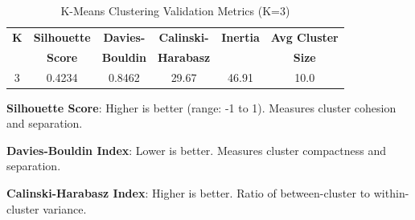 \begin{table}[htbp]
\centering
\caption{K-Means Clustering Validation Metrics (K=3)}
\label{tab:clustering_metrics}
\begin{tabular}{cccccc}
\toprule
\textbf{K} & \textbf{Silhouette} & \textbf{Davies-} & \textbf{Calinski-} & \textbf{Inertia} & \textbf{Avg Cluster} \\
           & \textbf{Score}      & \textbf{Bouldin} & \textbf{Harabasz}  &                  & \textbf{Size}        \\
\midrule
    3 & 0.4234 & 0.8462 & 29.67 & 46.91 & 10.0 \\
\bottomrule
\end{tabular}
\begin{tablenotes}
    \small
    \item \textbf{Silhouette Score}: Higher is better (range: -1 to 1). Measures cluster cohesion and separation.
    \item \textbf{Davies-Bouldin Index}: Lower is better. Measures cluster compactness and separation.
    \item \textbf{Calinski-Harabasz Index}: Higher is better. Ratio of between-cluster to within-cluster variance.
\end{tablenotes}
\end{table}
